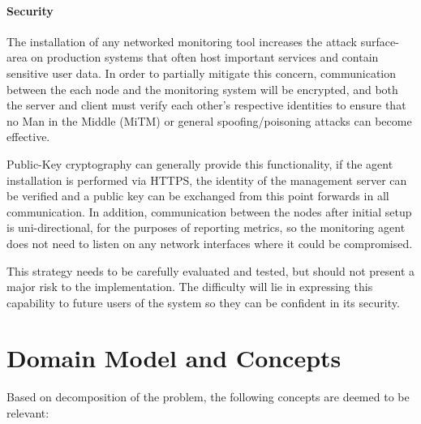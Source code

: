 \documentclass{cshonours}
\begin{document}
\paragraph{Security} The installation of any networked monitoring tool increases the attack surface-area on production systems that often host important services and contain sensitive user data. In order to partially mitigate this concern, communication between the each node and the monitoring system will be encrypted, and both the server and client must verify each other’s respective identities to ensure that no Man in the Middle (MiTM) or general spoofing/poisoning attacks can become effective.

Public-Key cryptography can generally provide this functionality, if the agent installation is performed via HTTPS, the identity of the management server can be verified and a public key can be exchanged from this point forwards in all communication. In addition, communication between the nodes after initial setup is uni-directional, for the purposes of reporting metrics, so the monitoring agent does not need to listen on any network interfaces where it could be compromised.

This strategy needs to be carefully evaluated and tested, but should not present a major risk to the implementation. The difficulty will lie in expressing this capability to future users of the system so they can be confident in its security.

\pagebreak
\section{Domain Model and Concepts}

Based on decomposition of the problem, the following concepts are deemed to be relevant:
\end{document}
